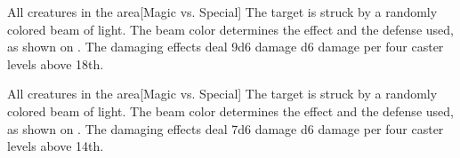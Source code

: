 \begin{spellheader}
\end{spellheader}
\begin{spelleffects}
    \begin{spelltargets}{All creatures in the area}[Magic vs. Special]
        \spellspecial The target is struck by a randomly colored beam of light. The beam color determines the effect and the defense used, as shown on . The damaging effects deal 9d6 damage \add d6 damage per four caster levels above 18th.
    \end{spelltargets}
\end{spelleffects}
\begin{spellfooter}
    
\end{spellfooter}

\begin{spellheader}
\end{spellheader}
\begin{spelleffects}
    \begin{spelltargets}{All creatures in the area}[Magic vs. Special]
        \spellspecial The target is struck by a randomly colored beam of light. The beam color determines the effect and the defense used, as shown on . The damaging effects deal 7d6 damage \add d6 damage per four caster levels above 14th.
    \end{spelltargets}
\end{spelleffects}
\begin{spellfooter}
    
\end{spellfooter}

